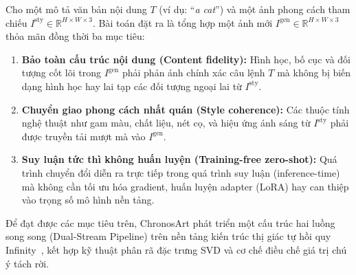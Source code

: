 \documentclass[10pt,twocolumn,letterpaper]{article}
\begin{document}
Cho một mô tả văn bản nội dung $T$ (ví dụ: ``\textit{a cat}'') và một ảnh phong cách tham chiếu $I^{\text{sty}} \in \mathbb{R}^{H \times W \times 3}$. Bài toán đặt ra là tổng hợp một ảnh mới $I^{\text{gen}} \in \mathbb{R}^{H \times W \times 3}$ thỏa mãn đồng thời ba mục tiêu:
\begin{enumerate}
    \item \textbf{Bảo toàn cấu trúc nội dung (Content fidelity):} Hình học, bố cục và đối tượng cốt lõi trong $I^{\text{gen}}$ phải phản ánh chính xác câu lệnh $T$ mà không bị biến dạng hình học hay lai tạp các đối tượng ngoại lai từ $I^{\text{sty}}$.
    \item \textbf{Chuyển giao phong cách nhất quán (Style coherence):} Các thuộc tính nghệ thuật như gam màu, chất liệu, nét cọ, và hiệu ứng ánh sáng từ $I^{\text{sty}}$ phải được truyền tải mượt mà vào $I^{\text{gen}}$.
    \item \textbf{Suy luận tức thì không huấn luyện (Training-free zero-shot):} Quá trình chuyển đổi diễn ra trực tiếp trong quá trình suy luận (inference-time) mà không cần tối ưu hóa gradient, huấn luyện adapter (LoRA) hay can thiệp vào trọng số mô hình nền tảng.
\end{enumerate}

Để đạt được các mục tiêu trên, ChronosArt phát triển một cấu trúc hai luồng song song (Dual-Stream Pipeline) trên nền tảng kiến trúc thị giác tự hồi quy Infinity~\cite{han2025infinity}, kết hợp kỹ thuật phân rã đặc trưng SVD và cơ chế điều chế giá trị chú ý tách rời.
\end{document}
